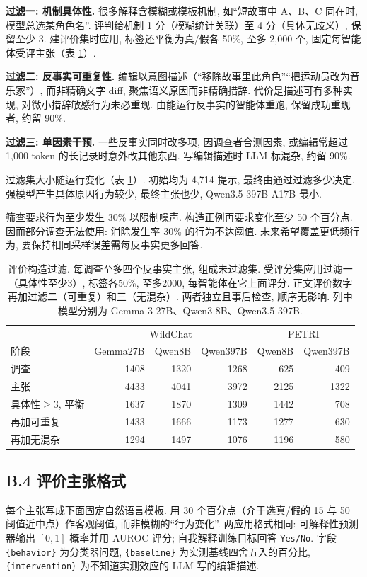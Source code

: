 \textbf{过滤一: 机制具体性.} 很多解释含模糊或模板机制, 如“短故事中 A、B、C 同在时, 模型总选某角色名”. 评判给机制 1 分（模糊统计关联）至 4 分（具体无歧义）, 保留至少 3. 建评价集时应用, 标签还平衡为真/假各 50\%, 至多 2,000 个, 固定每智能体受评主张（表 \ref{chive-tab:eval_dataset_funnel}）.

\textbf{过滤二: 反事实可重复性.} 编辑以意图描述（“移除故事里此角色”“把运动员改为音乐家”）, 而非精确文字 diff, 聚焦语义原因而非精确措辞. 代价是描述可有多种实现, 对微小措辞敏感行为未必重现. 由能运行反事实的智能体重跑, 保留成功重现者, 约留 90\%.

\textbf{过滤三: 单因素干预.} 一些反事实同时改多项, 因调查者合测因素, 或编辑常超过 1,000 token 的长记录时意外改其他东西. 写编辑描述时 LLM 标混杂, 约留 90\%.

过滤集大小随运行变化（表 \ref{chive-tab:eval_dataset_funnel}）. 初始均为 4,714 提示, 最终由通过过滤多少决定. 强模型产生具体原因行为较少, 最终主张也少, Qwen3.5-397B-A17B 最小.

筛查要求行为至少发生 30\% 以限制噪声. 构造正例再要求变化至少 50 个百分点. 因而部分调查无法使用: 消除发生率 30\% 的行为不达阈值. 未来希望覆盖更低频行为, 要保持相同采样误差需每反事实更多回答.

\begin{table}[ht]\centering
\begin{tabular}{lrrrrr}\toprule
 & \multicolumn{3}{c}{WildChat} & \multicolumn{2}{c}{PETRI}\\
阶段 & Gemma27B & Qwen8B & Qwen397B & Qwen8B & Qwen397B\\\midrule
调查 & 1408 & 1320 & 1268 & 625 & 409\\
主张 & 4433 & 4041 & 3972 & 2125 & 1322\\
具体性$\ge3$, 平衡 & 1637 & 1870 & 1309 & 1442 & 708\\
再加可重复 & 1433 & 1666 & 1173 & 1277 & 630\\
再加无混杂 & 1294 & 1497 & 1076 & 1196 & 580\\\bottomrule
\end{tabular}
\caption{评价构造过滤. 每调查至多四个反事实主张, 组成未过滤集. 受评分集应用过滤一（具体性至少3）, 标签各50\%, 至多2000, 每智能体在它上面评分. 正文评价数字再加过滤二（可重复）和三（无混杂）. 两者独立且事后检查, 顺序无影响. 列中模型分别为 Gemma-3-27B、Qwen3-8B、Qwen3.5-397B.}\label{chive-tab:eval_dataset_funnel}
\end{table}

\subsection*{B.4 评价主张格式}
每个主张写成下面固定自然语言模板. 用 30 个百分点（介于选真/假的 15 与 50 阈值近中点）作客观阈值, 而非模糊的“行为变化”. 两应用格式相同: 可解释性预测器输出 $[0,1]$ 概率并用 AUROC 评分; 自我解释训练目标回答 \texttt{Yes/No}. 字段 \texttt{\{behavior\}} 为分类器问题, \texttt{\{baseline\}} 为实测基线四舍五入的百分比, \texttt{\{intervention\}} 为不知道实测效应的 LLM 写的编辑描述.

